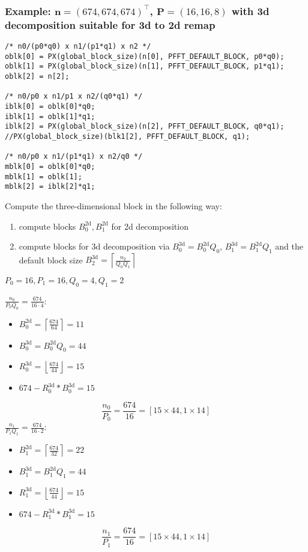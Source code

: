 \subsubsection{Example: $\mathbf n=(674, 674, 674)^\top$, $\mathbf P = (16,16,8)$ with 3d decomposition suitable for 3d to 2d remap}

\begin{lstlisting}
/* n0/(p0*q0) x n1/(p1*q1) x n2 */
oblk[0] = PX(global_block_size)(n[0], PFFT_DEFAULT_BLOCK, p0*q0);
oblk[1] = PX(global_block_size)(n[1], PFFT_DEFAULT_BLOCK, p1*q1);
oblk[2] = n[2];

/* n0/p0 x n1/p1 x n2/(q0*q1) */
iblk[0] = oblk[0]*q0;
iblk[1] = oblk[1]*q1;
iblk[2] = PX(global_block_size)(n[2], PFFT_DEFAULT_BLOCK, q0*q1);
//PX(global_block_size)(blk1[2], PFFT_DEFAULT_BLOCK, q1);

/* n0/p0 x n1/(p1*q1) x n2/q0 */
mblk[0] = oblk[0]*q0;
mblk[1] = oblk[1];
mblk[2] = iblk[2]*q1;
\end{lstlisting}

Compute the three-dimensional block in the following way:
\begin{enumerate}
 \item compute blocks $B_0^{\textrm{2d}}, B_1^{\textrm{2d}}$ for 2d decomposition
 \item compute blocks for 3d decomposition via $B_0^{\textrm{3d}} = B_0^{\textrm{2d}} Q_0$, $B_1^{\textrm{3d}} = B_1^{\textrm{2d}} Q_1$ and the default block size $B_2^{\textrm{3d}} = \left\lceil\frac{n_2}{Q_0Q_1}\right\rceil$
\end{enumerate}


$P_0 = 16, P_1 = 16, Q_0=4, Q_1=2$

$\frac{n_0}{P_0Q_0} = \frac{674}{16\cdot 4}$:
\begin{itemize}
 \item $B_0^{\textrm{2d}} = \left\lceil \frac{674}{64} \right\rceil = 11$
 \item $B_0^{\textrm{3d}} = B_0^{\textrm{2d}}Q_0 = 44$
 \item $R_0^{\textrm{3d}} = \left\lfloor \frac{674}{44} \right\rfloor = 15$
 \item $674 - R_0^{\textrm{3d}}*B_0^{\textrm{3d}} = 15$
\end{itemize}
\begin{equation*}
  \frac{n_0}{P_0} = \frac{674}{16} = \left[15\times 44, 1\times 14 \right]
\end{equation*}
$\frac{n_1}{P_1Q_1} = \frac{674}{16\cdot 2}$:
\begin{itemize}
 \item $B_1^{\textrm{2d}} = \left\lceil \frac{674}{32} \right\rceil = 22$
 \item $B_1^{\textrm{3d}} = B_1^{\textrm{2d}}Q_1 = 44$
 \item $R_1^{\textrm{3d}} = \left\lfloor \frac{674}{44} \right\rfloor = 15$
 \item $674 - R_1^{\textrm{3d}}*B_1^{\textrm{3d}} = 15$
\end{itemize}
\begin{equation*}
  \frac{n_1}{P_1} = \frac{674}{16} = \left[15\times 44, 1\times 14 \right]
\end{equation*}

